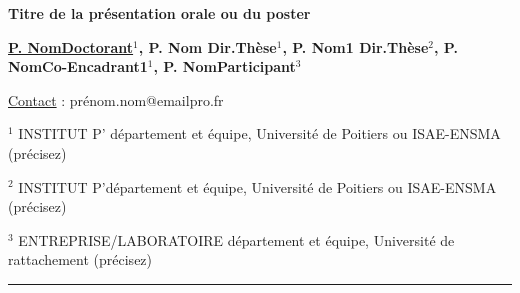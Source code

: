 \documentclass[11pt,a4paper]{article}
\begin{document}
\begin{center}
{\Large \textbf{Titre de la présentation orale ou du poster}}     
\end{center}

\setlength\parindent{0em}  \textbf{\underline{P. NomDoctorant}$^{1}$, P. Nom Dir.Thèse$^{1}$, P. Nom1 Dir.Thèse$^{2}$, P. NomCo-Encadrant1$^{1}$, P. NomParticipant$^{3}$
}
\begin{flushright}
  \underline{Contact} : prénom.nom@emailpro.fr 
\end{flushright}

\begin{flushleft}
    \scriptsize{
    $^1$	INSTITUT P’ département et équipe, Université de Poitiers ou ISAE-ENSMA (précisez)
    
    $^2$	INSTITUT P’département et équipe, Université de Poitiers ou ISAE-ENSMA (précisez)
    
    $^3$	ENTREPRISE/LABORATOIRE département et équipe, Université de rattachement (précisez) 
    }
\end{flushleft}

\rule{1\linewidth}{3pt}
\end{document}
